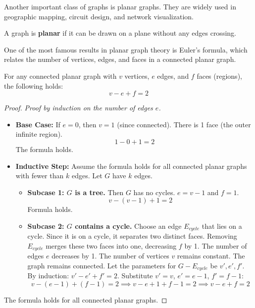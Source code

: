 Another important class of graphs is planar graphs. They are widely used in geographic mapping, circuit design, and network visualization.

\begin{definition}
A graph is \textbf{planar} if it can be drawn on a plane without any edges crossing.
\end{definition}

One of the most famous results in planar graph theory is Euler's formula, which relates the number of vertices, edges, and faces in a connected planar graph.

\begin{theorem}
For any connected planar graph with $v$ vertices, $e$ edges, and $f$ faces (regions), the following holds:
\[ v - e + f = 2 \]
\end{theorem}

\begin{proof}
\textit{Proof by induction on the number of edges $e$.}
\begin{itemize}
    \item \textbf{Base Case:} If $e=0$, then $v=1$ (since connected). There is 1 face (the outer infinite region).
    \[ 1 - 0 + 1 = 2 \]
    The formula holds.
    \item \textbf{Inductive Step:} Assume the formula holds for all connected planar graphs with fewer than $k$ edges. Let $G$ have $k$ edges.
    \begin{itemize}
        \item \textbf{Subcase 1: $G$ is a tree.} Then $G$ has no cycles. $e = v - 1$ and $f = 1$.
        \[ v - (v-1) + 1 = 2 \]
        Formula holds.
        \item \textbf{Subcase 2: $G$ contains a cycle.} Choose an edge $E_{cycle}$ that lies on a cycle. Since it is on a cycle, it separates two distinct faces. Removing $E_{cycle}$ merges these two faces into one, decreasing $f$ by 1. The number of edges $e$ decreases by 1. The number of vertices $v$ remains constant. The graph remains connected.
        Let the parameters for $G - E_{cycle}$ be $v', e', f'$.
        By induction: $v' - e' + f' = 2$.
        Substitute $v'=v$, $e'=e-1$, $f'=f-1$:
        \[ v - (e-1) + (f-1) = 2 \implies v - e + 1 + f - 1 = 2 \implies v - e + f = 2 \]
    \end{itemize}
\end{itemize}
The formula holds for all connected planar graphs.
\end{proof}

